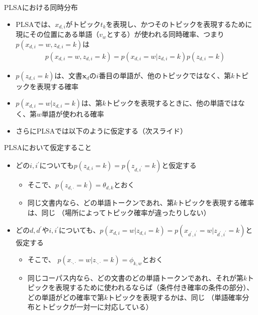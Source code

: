 \documentclass[aspectratio=169,unicode,dvipdfmx,14pt]{beamer}
\begin{document}
\begin{frame}{PLSAにおける同時分布}
\vspace{-.05in}
\begin{itemize}
\item PLSAでは、$x_{d,i}$がトピック$t_k$を表現し、かつそのトピックを表現するために現にその位置にある単語（$v_w$とする）が使われる同時確率、つまり$p(x_{d,i} = w, z_{d,i} = k)$は
\begin{align}
p(x_{d,i} = w, z_{d,i} = k ) = p(x_{d,i} = w | z_{d,i}=k) p(z_{d,i}=k)
\end{align}
\item $p(z_{d,i}=k)$は、文書$\bm{x}_d$の$i$番目の単語が、他のトピックではなく、第$k$トピックを表現する確率
\item $p(x_{d,i} = w |z_{d,i}=k)$は、第$k$トピックを表現するときに、他の単語ではなく、第$w$単語が使われる確率
\item さらにPLSAでは以下のように仮定する（次スライド）
\end{itemize}
\end{frame}

\begin{frame}{PLSAにおいて仮定すること}
\begin{itemize}
\item どの$i,i^\prime$についても$p(z_{d,i}=k)=p(z_{d,i^\prime}=k)$と仮定する
\begin{itemize}
\item そこで、$p(z_{d,\cdot}=k)=\theta_{d,k}$とおく
\item 同じ文書内なら、どの単語トークンであれ、第$k$トピックを表現する確率は、同じ
（場所によってトピック確率が違ったりしない）
\end{itemize}
\item どの$d, d^\prime$や$i,i^\prime$についても、$p(x_{d,i}=w|z_{d,i}=k) = p(x_{d^\prime,i^\prime}=w|z_{d^\prime,i^\prime}=k)$と仮定する
\begin{itemize}
\item そこで、 $p(x_{\cdot,\cdot}=w|z_{\cdot,\cdot}=k)=\phi_{k,w}$とおく
\item 同じコーパス内なら、どの文書のどの単語トークンであれ、それが第$k$トピックを表現するために使われるならば（条件付き確率の条件の部分）、どの単語がどの確率で第$k$トピックを表現するかは、同じ
（単語確率分布とトピックが一対一に対応している）
\end{itemize}
\end{itemize}
\end{frame}
\end{document}
